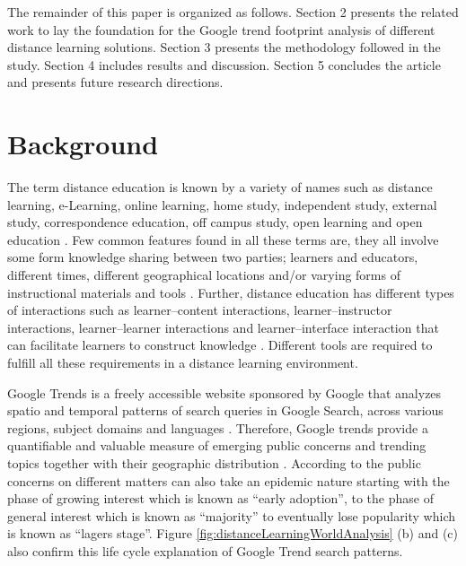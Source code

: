 \documentclass[11pt,a4paper,]{article}
\begin{document}
The remainder of this paper is organized as follows. Section 2 presents the related work to lay the foundation for the Google trend footprint analysis of different distance learning solutions. Section 3 presents the methodology followed in the study. Section 4 includes results and discussion. Section 5 concludes the article and presents future research directions.

\hypertarget{background}{%
\section{Background}\label{background}}

The term distance education is known by a variety of names such as distance learning, e-Learning, online learning, home study, independent study, external study, correspondence education, off campus study, open learning and open education \autocite{moore2011learning}. Few common features found in all these terms are, they all involve some form knowledge sharing between two parties; learners and educators, different times, different geographical locations and/or varying forms of instructional materials and tools \autocite{moore2011learning}. Further, distance education has different types of interactions such as learner--content interactions, learner--instructor interactions, learner--learner interactions and learner--interface interaction that can facilitate learners to construct knowledge \autocite{wallace2003online}. Different tools are required to fulfill all these requirements in a distance learning environment.

Google Trends is a freely accessible website sponsored by Google that analyzes spatio and temporal patterns of search queries in Google Search, across various regions, subject domains and languages \autocite{carneiro2009google}. Therefore, Google trends provide a quantifiable and valuable measure of emerging public concerns and trending topics together with their geographic distribution \autocite{alicino2015assessing,cook2011assessing}. According to \textcite{jarynowski2020perception} the public concerns on different matters can also take an epidemic nature starting with the phase of growing interest which is known as ``early adoption'', to the phase of general interest which is known as ``majority'' to eventually lose popularity which is known as ``lagers stage''. Figure \ref{fig:distanceLearningWorldAnalysis} (b) and (c) also confirm this life cycle explanation of Google Trend search patterns.
\end{document}
